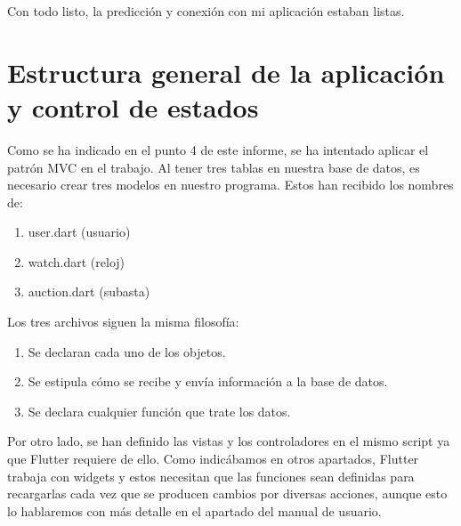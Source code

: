 	Con todo listo, la predicción y conexión con mi aplicación estaban listas.
	
\section{Estructura general de la aplicación y control de estados}
	
	Como se ha indicado en el punto 4 de este informe, se ha intentado aplicar el patrón MVC en el trabajo. Al tener tres tablas en nuestra base de datos, es necesario crear tres modelos en nuestro programa. Estos han recibido los nombres de:
	\begin{enumerate}
		\item user.dart (usuario)
		\item watch.dart (reloj)
		\item auction.dart (subasta)
	\end{enumerate}

	Los tres archivos siguen la misma filosofía:
	\begin{enumerate}
		\item Se declaran cada uno de los objetos.
		\item Se estipula cómo se recibe y envía información a la base de datos.
		\item Se declara cualquier función que trate los datos.
	\end{enumerate}
	
	Por otro lado, se han definido las vistas y los controladores en el mismo script ya que Flutter requiere de ello. Como indicábamos en otros apartados, Flutter trabaja con widgets y estos necesitan que las funciones sean definidas para recargarlas cada vez que se producen cambios por diversas acciones, aunque esto lo hablaremos con más detalle en el apartado del manual de usuario.
	
